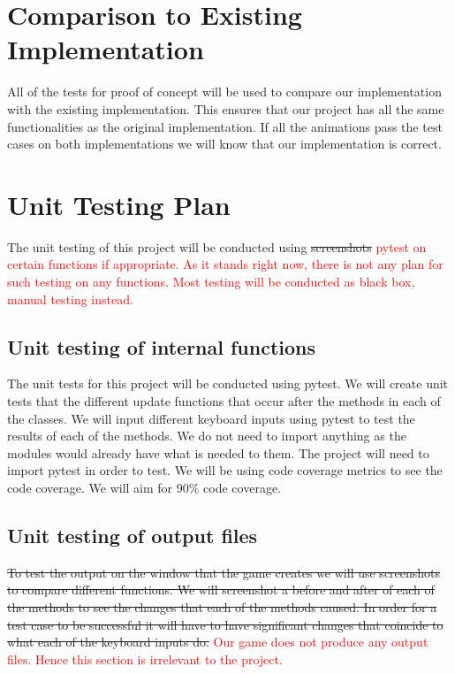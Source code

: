 \documentclass[12pt, titlepage]{article}
\begin{document}
\section{Comparison to Existing Implementation}    

All of the tests for proof of concept will be used to compare our implementation with the existing implementation. This ensures that our project has all the same functionalities as the original implementation. If all the animations pass the test cases on both implementations we will know that our implementation is correct. 
                
\section{Unit Testing Plan}
The unit testing of this project will be conducted using \sout{screenshots } \textcolor{red}{ pytest on certain functions if appropriate. As it stands right now, there is not any plan for such testing on any functions. Most testing will be conducted as black box, manual testing instead.}

\subsection{Unit testing of internal functions}
The unit tests for this project will be conducted using pytest. We will create unit tests that the different update functions that occur after the methods in each of the classes. We will input different keyboard inputs using pytest to test the results of each of the methods. We do not need to import anything as the modules would already have what is needed to them. The project will need to import pytest in order to test. We will be using code coverage metrics to see the code coverage. We will aim for 90\% code coverage.

\subsection{Unit testing of output files}        
\sout{To test the output on the window that the game creates we will use screenshots to compare different functions. We will screenshot a before and after of each of the methods to see the changes that each of the methods caused. In order for a test case to be successful it will have to have significant changes that coincide to what each of the keyboard inputs do.} \textcolor{red}{Our game does not produce any output files. Hence this section is irrelevant to the project.}
\end{document}
